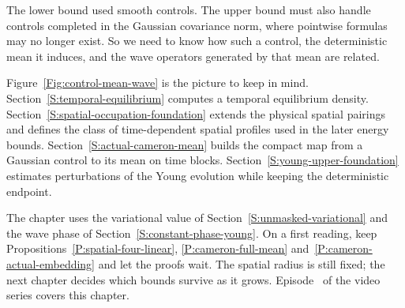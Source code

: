 The lower bound used smooth controls. The upper bound must also handle controls
completed in the Gaussian covariance norm, where pointwise formulas may no
longer exist. So we need to know how such a control, the deterministic mean
it induces, and the wave operators generated by that mean are related.

Figure~\ref{Fig:control-mean-wave} is the picture to keep in
mind. Section~\ref{S:temporal-equilibrium} computes a temporal equilibrium
density. Section~\ref{S:spatial-occupation-foundation} extends the physical
spatial pairings and defines the class of time-dependent spatial profiles
used in the later energy bounds. Section~\ref{S:actual-cameron-mean}
builds the compact map from a Gaussian control to its mean on time
blocks. Section~\ref{S:young-upper-foundation} estimates perturbations of
the Young evolution while keeping the deterministic endpoint.

The chapter uses the variational value of Section~\ref{S:unmasked-variational}
and the wave phase of Section~\ref{S:constant-phase-young}. On a first reading,
keep Propositions~\ref{P:spatial-four-linear}, \ref{P:cameron-full-mean}
and~\ref{P:cameron-actual-embedding} and let the proofs wait. The spatial
radius is still fixed; the next chapter decides which bounds survive as
it grows. Episode~ of the video series covers
this chapter.
